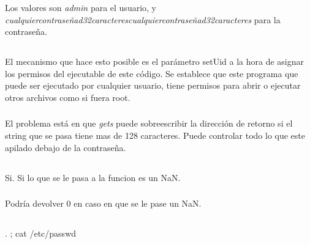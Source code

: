 \subsubsection{}
Los valores son \textit{admin} para el usuario, y
\textit{cualquiercontraseñad32caracterescualquiercontraseñad32caracteres} para
la contraseña.

\subsection{}

\subsubsection{}
El mecanismo que hace esto posible es el parámetro setUid a la hora de asignar
los permisos del ejecutable de este código. Se establece que este programa que
puede ser ejecutado por cualquier usuario, tiene permisos para abrir o
ejecutar otros archivos como si fuera root.

\subsubsection{}
El problema está en que \textit{gets} puede sobreescribir la dirección de
retorno si el string que se pasa tiene mas de 128 caracteres. Puede controlar
todo lo que este apilado debajo de la contraseña.

\subsection{}

\subsubsection{}
Si. Si lo que se le pasa a la funcion es un NaN.

\subsubsection{}
Podría devolver 0 en caso en que se le pase un NaN.

\setcounter{subsection}{7}
\subsection{}

\subsubsection{}
. ; cat /etc/passwd

